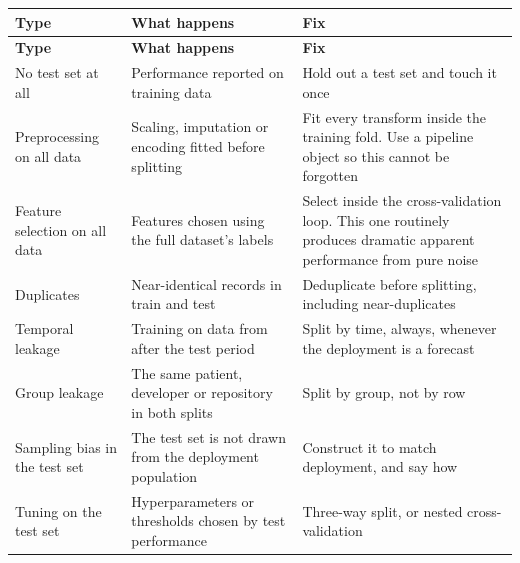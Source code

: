 \begin{center}
\small
\begin{longtable}{@{}L{3.4cm}L{4.6cm}L{6.2cm}@{}}
\toprule
\textbf{Type} & \textbf{What happens} & \textbf{Fix} \\
\midrule
\endfirsthead
\toprule
\textbf{Type} & \textbf{What happens} & \textbf{Fix} \\
\midrule
\endhead
\bottomrule
\endfoot
No test set at all
  & Performance reported on training data
  & Hold out a test set and touch it once \\
Preprocessing on all data
  & Scaling, imputation or encoding fitted before splitting
  & Fit every transform inside the training fold. Use a pipeline object so this
    cannot be forgotten \\
Feature selection on all data
  & Features chosen using the full dataset's labels
  & Select inside the cross-validation loop. This one routinely produces
    dramatic apparent performance from pure noise \\
Duplicates
  & Near-identical records in train and test
  & Deduplicate before splitting, including near-duplicates \\
Temporal leakage
  & Training on data from after the test period
  & Split by time, always, whenever the deployment is a forecast \\
Group leakage
  & The same patient, developer or repository in both splits
  & Split by group, not by row \\
Sampling bias in the test set
  & The test set is not drawn from the deployment population
  & Construct it to match deployment, and say how \\
Tuning on the test set
  & Hyperparameters or thresholds chosen by test performance
  & Three-way split, or nested cross-validation \\
\end{longtable}
\end{center}

